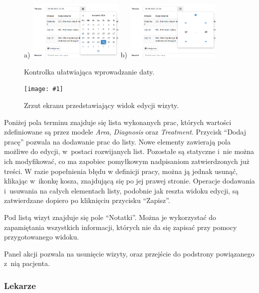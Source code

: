 \documentclass[11pt]{aghdpl}
\newcommand{\fullWidthPicture}[2]{
\begin{figure}[h!]
	\centering
		\texttt{[image: \#1]}
	\caption{#2}
	\label{fig:#1}
\end{figure}
}
\begin{document}
\begin{figure}[h!]
	\begin{center}
		a)~\includegraphics[width=0.4\textwidth]{datePickerDate}
		\hspace{5mm}
		b)~\includegraphics[width=0.4\textwidth]{datePickerTime}
	\end{center}
	\caption{Kontrolka ułatwiająca wprowadzanie daty.}
	\label{fig:datepicker}
\end{figure}

\fullWidthPicture{wizyta}{Zrzut ekranu przedstawiający widok edycji wizyty.}

Poniżej pola terminu znajduje się lista wykonanych prac, których wartości zdefiniowane są przez modele \emph{Area}, \emph{Diagnosis} oraz \emph{Treatment}. Przycisk ``Dodaj pracę'' pozwala na dodawanie prac do listy. Nowe elementy zawierają pola możliwe do edycji, w~postaci rozwijanych list. Pozostałe są statyczne i~nie można ich modyfikować, co ma zapobiec pomyłkowym nadpisaniom zatwierdzonych już treści. W razie popełnienia błędu w definicji pracy, można ją jednak usunąć, klikając w~ikonkę kosza, znajdującą się po jej prawej stronie. Operacje dodawania i~usuwania na całych elementach listy, podobnie jak reszta widoku edycji, są zatwierdzane dopiero po kliknięciu przycisku ``Zapisz''.

Pod listą wizyt znajduje się pole ``Notatki''. Można je wykorzystać do zapamiętania wszystkich informacji, których nie da się zapisać przy pomocy przygotowanego widoku.

Panel akcji pozwala na usunięcie wizyty, oraz przejście do podstrony powiązanego z~nią pacjenta.


\subsubsection{Lekarze}
\label{sec:lekarze}
\end{document}
